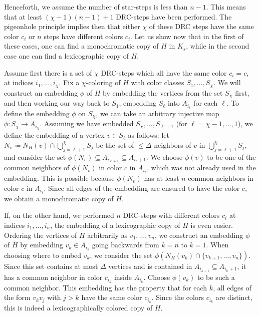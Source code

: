 \documentclass[a4paper,11pt]{article}
\makeatletter
\renewenvironment{proof}[1][\proofname] {\par\pushQED{\qed}\normalfont\topsep6\p@\@plus6\p@\relax\trivlist\item[\hskip\labelsep\bfseries#1\@addpunct{.}]\ignorespaces}{\popQED\endtrivlist\@endpefalse}
\theoremstyle{definition}
\makeatother
\begin{document}
\begin{proof}[Proof of Theorem~\ref{thm:upper bound non-bipartite}.]
Henceforth, we assume the number of star-steps is less than $n-1$. This means that at least $(\chi-1)(n-1)+1$ DRC-steps have been performed. The pigeonhole principle implies then that either $\chi$ of these DRC steps have the same color $c_i$ or $n$ steps have different colors $c_i$. Let us show now that in the first of these cases, one can find a monochromatic copy of $H$ in $K_s$, while in the second case one can find a lexicographic copy of $H$.  

Assume first there is a set of $\chi$ DRC-steps which all have the same color $c_i=c$, at indices $i_1, \dots, i_\chi$. Fix a $\chi$-coloring of $H$ with color classes $S_1, \dots, S_\chi$. We will construct an embedding $\phi$ of $H$ by embedding the vertices from the set $S_\chi$ first, and then working our way back to $S_1$, embedding $S_{\ell}$ into $A_{i_{\ell}}$ for each $\ell$.
To define the embedding $\phi$ on $S_\chi$, we can take an arbitrary injective map $\phi:S_\chi\to A_{i_\chi}$. Assuming we have embedded $S_{\chi}, \dots, S_{\ell+1}$ (for $\ell=\chi-1,\dots,1$), we define the embedding of a vertex $v\in S_\ell$ as follows: let $N_v \coloneqq N_H(v)\cap \bigcup_{j=\ell+1}^\chi S_j$ be the set of $\leq \Delta$ neighbors of $v$ in $\bigcup_{j=\ell+1}^\chi S_j$, and consider the set
$\phi(N_v)\subseteq A_{i_{\ell+1}}\subseteq A_{i_\ell+1}$. 
We choose $\phi(v)$ to be one of the common neighbors of $\phi(N_v)$ in color $c$ in $A_{i_\ell}$, which was not already used in the embedding.
This is possible because $\phi(N_v)$ has at least $n$ common neighbors in color $c$ in $A_{i_\ell}$.
Since all edges of the embedding are ensured to have the color $c$, we obtain a monochromatic copy of $H$.

If, on the other hand, we performed $n$ DRC-steps with different colors $c_i$ at indices $i_1, \dots, i_n$, the embedding of a lexicographic copy of $H$ is even easier. Ordering the vertices of $H$ arbitrarily as $v_1, \dots, v_n$, we construct an embedding $\phi$ of $H$ by embedding $v_k\in A_{i_k}$ going backwards from $k=n$ to $k=1$. When choosing where to embed $v_k$, we consider the set $\phi(N_H(v_k)\cap\{v_{k+1}, \dots, v_n\})$. Since this set contains at most $\Delta$ vertices and is contained in $A_{i_{k+1}}\subseteq A_{i_k+1}$, 
it has a common neighbor in color $c_{i_k}$ inside $A_{i_k}$. Choose $\phi(v_k)$ to be such a common neighbor. 
This embedding has the property that for each $k$, all edges of the form $v_kv_j$ with $j > k$ have the same color $c_{i_k}$. Since the colors $c_{i_k}$ are distinct, this is indeed a lexicographically colored copy of $H$.
\end{proof}
\end{document}
